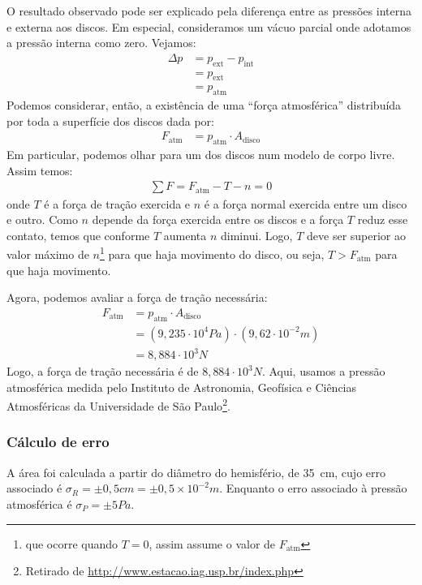 O resultado observado pode ser explicado pela diferença entre as pressões
interna e externa aos discos. Em especial, consideramos um vácuo parcial onde
adotamos a pressão interna como zero. Vejamos:
\begin{align*}
    \Delta p &= p_{\text{ext}} - p_{\text{int}}\\
    &= p_{\text{ext}}\\
    &= p_{\text{atm}}
\end{align*}
Podemos considerar, então, a existência de uma ``força atmosférica'' distribuída
por toda a superfície dos discos dada por:
\begin{align*}
    F_{\text{atm}} &= p_{\text{atm}} \cdot A_{\text{disco}}
\end{align*}
Em particular, podemos olhar para um dos discos num modelo de corpo livre.
Assim temos:
\begin{align*}
    \sum F = F_{\text{atm}} - T - n = 0
\end{align*}
onde \( T \) é a força de tração exercida e \( n \) é a força normal exercida
entre um disco e outro. Como \( n \) depende da força exercida entre os
discos e a força \( T \) reduz esse contato, temos que conforme \( T \) aumenta
\( n \) diminui. Logo, \( T \) deve ser superior ao valor máximo de \( n
\)\footnote{que ocorre quando \( T=0 \), assim assume o valor de
\(F_{\text{atm}}\)} para que haja movimento do disco, ou seja, 
\( T > F_{\text{atm}} \) para que haja movimento.

Agora, podemos avaliar a força de tração necessária:
\begin{align*}
    F_{\text{atm}} &= p_{\text{atm}} \cdot A_{\text{disco}}\\
    &= (9,235 \cdot 10^4 \unit{Pa}) \cdot (9,62 \cdot 10^{-2} \unit{m})\\
    &= 8,884 \cdot 10^3 \unit{N}
\end{align*}
Logo, a força de tração necessária é de \( 8,884 \cdot 10^3 \unit{N} \). 
Aqui, usamos a pressão atmosférica medida pelo Instituto de Astronomia,
Geofísica e Ciências Atmosféricas da Universidade de São Paulo\footnote{Retirado
de \url{http://www.estacao.iag.usp.br/index.php}}.

\subsubsection{Cálculo de erro}
A área foi calculada a partir do diâmetro do hemisfério, de \qty{35}{cm},
cujo erro associado é \(\sigma_R = \pm 0,5 \unit{cm} =
\pm 0,5 \times 10^{-2} \unit{m} \).
Enquanto o erro associado à pressão atmosférica é \(\sigma_P = \pm 5
\unit{Pa}\).

